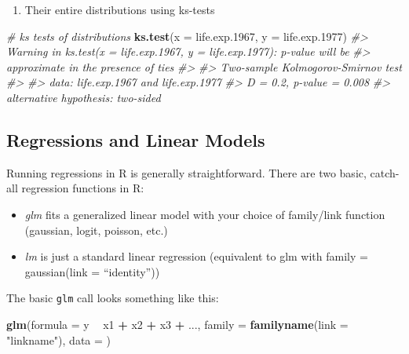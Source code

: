 \documentclass[]{book}
\newenvironment{Shaded}{\begin{snugshade}}{\end{snugshade}}
\newcommand{\CommentTok}[1]{\textcolor[rgb]{0.56,0.35,0.01}{\textit{#1}}}
\newcommand{\DataTypeTok}[1]{\textcolor[rgb]{0.13,0.29,0.53}{#1}}
\newcommand{\FloatTok}[1]{\textcolor[rgb]{0.00,0.00,0.81}{#1}}
\newcommand{\KeywordTok}[1]{\textcolor[rgb]{0.13,0.29,0.53}{\textbf{#1}}}
\newcommand{\NormalTok}[1]{#1}
\newcommand{\OperatorTok}[1]{\textcolor[rgb]{0.81,0.36,0.00}{\textbf{#1}}}
\newcommand{\StringTok}[1]{\textcolor[rgb]{0.31,0.60,0.02}{#1}}
\providecommand{\tightlist}{%
  \setlength{\itemsep}{0pt}\setlength{\parskip}{0pt}}
\begin{document}
\begin{enumerate}
\def\labelenumi{\arabic{enumi})}
\setcounter{enumi}{1}
\tightlist
\item
  Their entire distributions using ks-tests
\end{enumerate}

\begin{Shaded}
\begin{Highlighting}[]
\CommentTok{# ks tests of distributions}
\KeywordTok{ks.test}\NormalTok{(}\DataTypeTok{x =}\NormalTok{ life.exp}\FloatTok{.1967}\NormalTok{, }\DataTypeTok{y =}\NormalTok{ life.exp}\FloatTok{.1977}\NormalTok{)}
\CommentTok{#> Warning in ks.test(x = life.exp.1967, y = life.exp.1977): p-value will be}
\CommentTok{#> approximate in the presence of ties}
\CommentTok{#> }
\CommentTok{#>  Two-sample Kolmogorov-Smirnov test}
\CommentTok{#> }
\CommentTok{#> data:  life.exp.1967 and life.exp.1977}
\CommentTok{#> D = 0.2, p-value = 0.008}
\CommentTok{#> alternative hypothesis: two-sided}
\end{Highlighting}
\end{Shaded}

\hypertarget{regressions-and-linear-models}{%
\subsection{Regressions and Linear Models}\label{regressions-and-linear-models}}

Running regressions in R is generally straightforward. There are two basic, catch-all regression functions in R:

\begin{itemize}
\item
  \emph{glm} fits a generalized linear model with your choice of family/link function (gaussian, logit, poisson, etc.)
\item
  \emph{lm} is just a standard linear regression (equivalent to glm with family = gaussian(link = ``identity''))
\end{itemize}

The basic \texttt{glm} call looks something like this:

\begin{Shaded}
\begin{Highlighting}[]
\KeywordTok{glm}\NormalTok{(}\DataTypeTok{formula =}\NormalTok{ y }\OperatorTok{~}\StringTok{ }\NormalTok{x1 }\OperatorTok{+}\StringTok{ }\NormalTok{x2 }\OperatorTok{+}\StringTok{ }\NormalTok{x3 }\OperatorTok{+}\StringTok{ }\NormalTok{..., }\DataTypeTok{family =} \KeywordTok{familyname}\NormalTok{(}\DataTypeTok{link =} \StringTok{"linkname"}\NormalTok{), }\DataTypeTok{data =}\NormalTok{ )}
\end{Highlighting}
\end{Shaded}
\end{document}
